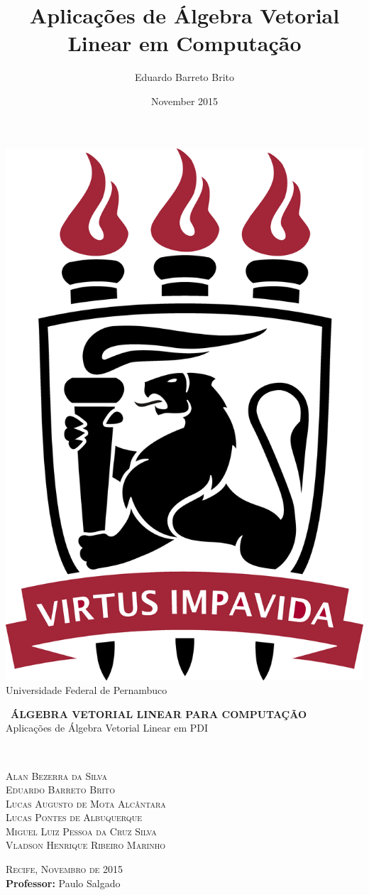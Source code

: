 \documentclass{article}
\title{Aplicações de Álgebra Vetorial Linear em Computação}
\author{Eduardo Barreto Brito }
\date{November 2015}
\begin{document}
    \thispagestyle{empty}
    \begin{center}
        \includegraphics[scale=0.01]{ufpe.png}\\
        \large{{\sc Universidade Federal de Pernambuco}}
    \end{center}
    \vspace{7cm}
    \hrulefill
    \begin{center}
        \large{ \ {\bf ÁLGEBRA VETORIAL LINEAR PARA COMPUTAÇÃO}}\\[0.2cm]
        \large{\textsf{Aplicações de Álgebra Vetorial Linear em PDI}}\\
    \end{center}
    \hrulefill\\[3.4cm]
    \begin{center}
        \textsc{Alan Bezerra da Silva}\\
        \textsc{Eduardo Barreto Brito}\\
        \textsc{Lucas Augusto de Mota Alcântara}\\
        \textsc{Lucas Pontes de Albuquerque}\\
        \textsc{Miguel Luiz Pessoa da Cruz Silva}\\
        \textsc{Vladson Henrique Ribeiro Marinho}
    \end{center}
    \vspace{2.6cm}
    \textsc{Recife, Novembro de 2015}\\
    {\bf Professor:} Paulo Salgado
    \newpage
    \tableofcontents
    \newpage
\end{document}

